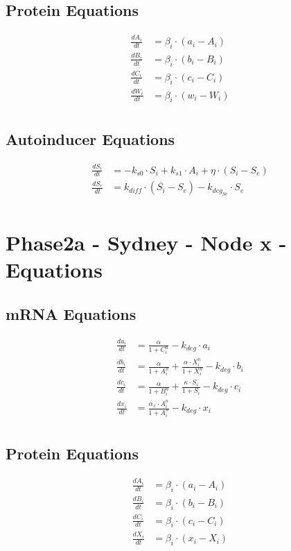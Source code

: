 \documentclass[fleqn]{article}
\begin{document}
\subsection*{Protein Equations}
\begin{align*}
\frac{dA_i}{dt} &= \beta_i \cdot (a_i - A_i) \\
\frac{dB_i}{dt} &= \beta_i \cdot (b_i - B_i) \\
\frac{dC_i}{dt} &= \beta_i \cdot (c_i - C_i) \\
\frac{dW_i}{dt} &= \beta_i \cdot (w_i - W_i) \\
\end{align*}

\subsection*{Autoinducer Equations}
\begin{align*}
\frac{dS_i}{dt} &= -k_{s0} \cdot S_i + k_{s1} \cdot A_i + \eta \cdot (S_i - S_e) \\
\frac{dS_e}{dt} &= k_{diff} \cdot (\overline{S_i} - S_e) - k_{deg_{Se}} \cdot S_e \\
\end{align*}

\pagebreak

\section*{Phase2a - Sydney - Node x - Equations}
\subsection*{mRNA Equations}
\begin{align*}
\frac{da_i}{dt} &= \frac{\alpha}{1 + C_i^n} - k_{deg} \cdot a_i \\
\frac{db_i}{dt} &= \frac{\alpha}{1 + A_i^n} + \frac{\alpha \cdot X_i^n}{1 + X_i^n} - k_{deg} \cdot b_i \\
\frac{dc_i}{dt} &= \frac{\alpha}{1 + B_i^n} + \frac{\kappa \cdot S_i}{1 + S_i} - k_{deg} \cdot c_i \\
\frac{dx_i}{dt} &= \frac{\alpha_x \cdot A_i^n}{1 + A_i^n} - k_{deg} \cdot x_i \\
\end{align*}

\subsection*{Protein Equations}
\begin{align*}
\frac{dA_i}{dt} &= \beta_i \cdot (a_i - A_i) \\
\frac{dB_i}{dt} &= \beta_i \cdot (b_i - B_i) \\
\frac{dC_i}{dt} &= \beta_i \cdot (c_i - C_i) \\
\frac{dX_i}{dt} &= \beta_i \cdot (x_i - X_i) \\
\end{align*}
\end{document}
